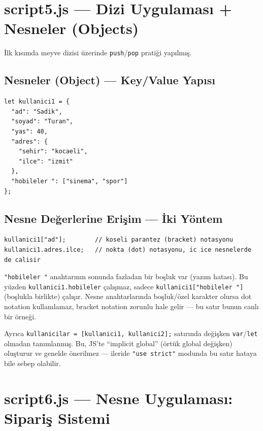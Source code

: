 \documentclass[11pt,a4paper]{article}
\begin{document}
\newpage

\section{script5.js --- Dizi Uygulaması + Nesneler (Objects)}

İlk kısımda meyve dizisi üzerinde \texttt{push}/\texttt{pop} pratiği yapılmış.

\subsection*{Nesneler (Object) --- Key/Value Yapısı}

\begin{lstlisting}
let kullanici1 = {
  "ad": "Sadik",
  "soyad": "Turan",
  "yas": 40,
  "adres": {
    "sehir": "kocaeli",
    "ilce": "izmit"
  },
  "hobileler ": ["sinema", "spor"]
};
\end{lstlisting}

\subsection*{Nesne Değerlerine Erişim --- İki Yöntem}

\begin{lstlisting}
kullanici1["ad"];        // koseli parantez (bracket) notasyonu
kullanici1.adres.ilce;   // nokta (dot) notasyonu, ic ice nesnelerde de calisir
\end{lstlisting}

\begin{dikkat}
\texttt{"hobileler "} anahtarının sonunda fazladan bir boşluk var (yazım hatası). Bu yüzden \texttt{kullanici1.hobileler} çalışmaz, sadece \texttt{kullanici1["hobileler "]} (boşlukla birlikte) çalışır. Nesne anahtarlarında boşluk/özel karakter olursa dot notation kullanılamaz, bracket notation zorunlu hale gelir --- bu satır bunun canlı bir örneği.

Ayrıca \texttt{kullanicilar = [kullanici1, kullanici2];} satırında değişken \texttt{var}/\texttt{let} olmadan tanımlanmış. Bu, JS'te ``implicit global'' (örtük global değişken) oluşturur ve genelde önerilmez --- ileride \texttt{"use strict"} modunda bu satır hataya bile sebep olabilir.
\end{dikkat}

\newpage

\section{script6.js --- Nesne Uygulaması: Sipariş Sistemi}
\end{document}
